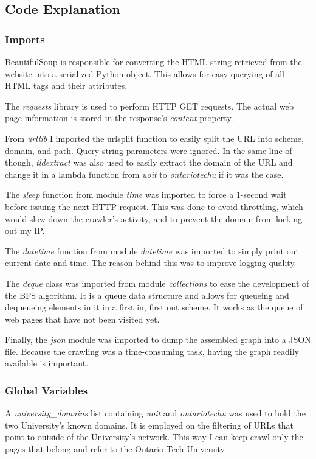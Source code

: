 \subsection{Code Explanation}
\subsubsection{Imports}
BeautifulSoup is responsible for converting the HTML string retrieved from the website into a serialized Python object. This allows for easy querying of all HTML tags and their attributes.

The \textit{requests} library is used to perform HTTP GET requests. The actual web page information is stored in the response's \textit{content} property.

From \textit{urllib} I imported the urlsplit function to easily split the URL into scheme, domain, and path. Query string parameters were ignored. In the same line of though, \textit{tldextract} was also used to easily extract the domain of the URL and change it in a lambda function from \textit{uoit} to \textit{ontariotechu} if it was the case.

The \textit{sleep} function from module \textit{time} was imported to force a 1-second wait before issuing the next HTTP request. This was done to avoid throttling, which would slow down the crawler's activity, and to prevent the domain from locking out my IP.

The \textit{datetime} function from module \textit{datetime} was imported to simply print out current date and time. The reason behind this was to improve logging quality.

The \textit{deque} class was imported from module \textit{collections} to ease the development of the BFS algorithm. It is a queue data structure and allows for queueing and dequeueing elements in it in a first in, first out scheme. It works as the queue of web pages that have not been visited yet.

Finally, the \textit{json} module was imported to dump the assembled graph into a JSON file. Because the crawling was a time-consuming task, having the graph readily available is important.

\subsubsection{Global Variables}
A \textit{university\_domains} list containing \textit{uoit} and \textit{ontariotechu} was used to hold the two University's known domains. It is employed on the filtering of URLs that point to outside of the University's network. This way I can keep crawl only the pages that belong and refer to the Ontario Tech University.

